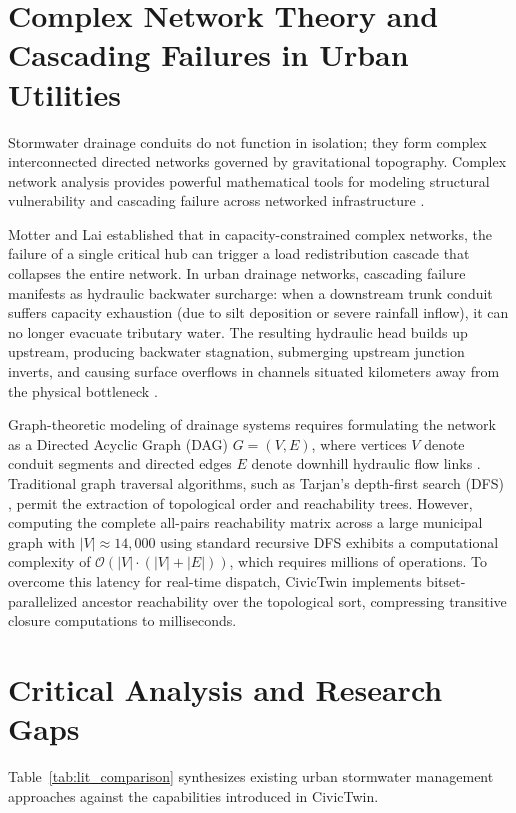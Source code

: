 \section{Complex Network Theory and Cascading Failures in Urban Utilities}
Stormwater drainage conduits do not function in isolation; they form complex interconnected directed networks governed by gravitational topography. Complex network analysis provides powerful mathematical tools for modeling structural vulnerability and cascading failure across networked infrastructure \cite{newman2018networks, yazdani2012complex}.

Motter and Lai \cite{motter2002cascade} established that in capacity-constrained complex networks, the failure of a single critical hub can trigger a load redistribution cascade that collapses the entire network. In urban drainage networks, cascading failure manifests as hydraulic backwater surcharge: when a downstream trunk conduit suffers capacity exhaustion (due to silt deposition or severe rainfall inflow), it can no longer evacuate tributary water. The resulting hydraulic head builds up upstream, producing backwater stagnation, submerging upstream junction inverts, and causing surface overflows in channels situated kilometers away from the physical bottleneck \cite{yazdani2012complex}.

Graph-theoretic modeling of drainage systems requires formulating the network as a Directed Acyclic Graph (DAG) $G = (V, E)$, where vertices $V$ denote conduit segments and directed edges $E$ denote downhill hydraulic flow links \cite{diestel2017graph}. Traditional graph traversal algorithms, such as Tarjan's depth-first search (DFS) \cite{tarjan1972depth}, permit the extraction of topological order and reachability trees. However, computing the complete all-pairs reachability matrix across a large municipal graph with $|V| \approx 14,000$ using standard recursive DFS exhibits a computational complexity of $\mathcal{O}(|V| \cdot (|V| + |E|))$, which requires millions of operations. To overcome this latency for real-time dispatch, CivicTwin implements bitset-parallelized ancestor reachability over the topological sort, compressing transitive closure computations to milliseconds.

\section{Critical Analysis and Research Gaps}
Table~\ref{tab:lit_comparison} synthesizes existing urban stormwater management approaches against the capabilities introduced in CivicTwin.

